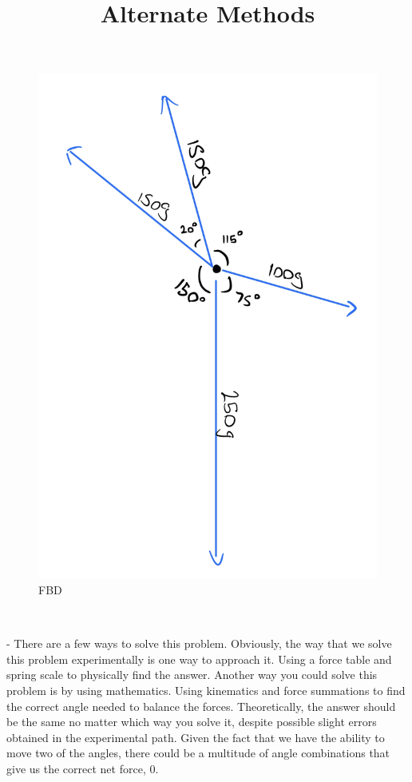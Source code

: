 \documentclass[letter paper, title page]{article}
\begin{document}
\begin{figure}[H]
    \centering
    \includegraphics[scale = 0.1]{fbd9.jpg}
    \caption{FBD}
    \label{fig:my_label}
\end{figure}

\noindent
\title{\textbf{Alternate Methods}}

\begin{list}
    \\\item - There are a few ways to solve this problem. Obviously, the way that we solve this problem experimentally is one way to approach it. Using a force table and spring scale to physically find the answer. Another  way you could solve this problem is by using mathematics. Using kinematics and force summations to find the correct angle needed to balance the forces. Theoretically, the answer should be the same no matter which way you solve it, despite possible slight errors obtained in the experimental path. Given the fact that we have the ability to move two of the angles, there could be a multitude of angle combinations that give us the correct net force, 0. 
\end{list}
\end{document}
